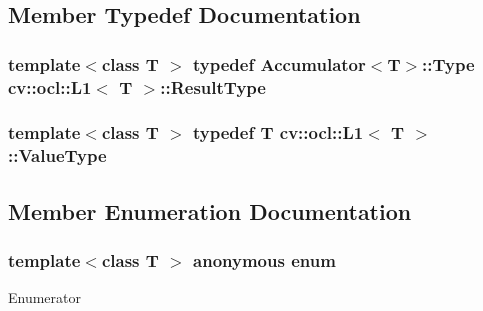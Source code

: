 \subsection{Member Typedef Documentation}
\hypertarget{structcv_1_1ocl_1_1L1_abe051206cac634a5a6bd94feae851875}{
\subsubsection[{Result\-Type}]{\setlength{\rightskip}{0pt plus 5cm}template$<$class T $>$ typedef {\bf Accumulator}$<${\bf T}$>$\-::Type {\bf cv\-::ocl\-::\-L1}$<$ {\bf T} $>$\-::{\bf Result\-Type}}}\label{structcv_1_1ocl_1_1L1_abe051206cac634a5a6bd94feae851875}
\hypertarget{structcv_1_1ocl_1_1L1_a717e28847f2520db35b82753039cebc2}{
\subsubsection[{Value\-Type}]{\setlength{\rightskip}{0pt plus 5cm}template$<$class T $>$ typedef {\bf T} {\bf cv\-::ocl\-::\-L1}$<$ {\bf T} $>$\-::{\bf Value\-Type}}}\label{structcv_1_1ocl_1_1L1_a717e28847f2520db35b82753039cebc2}


\subsection{Member Enumeration Documentation}
\hypertarget{structcv_1_1ocl_1_1L1_aba06491002e9cc3b0a573cf966cbb6bf}{\subsubsection[{anonymous enum}]{\setlength{\rightskip}{0pt plus 5cm}template$<$class T $>$ anonymous enum}}\label{structcv_1_1ocl_1_1L1_aba06491002e9cc3b0a573cf966cbb6bf}
\begin{Desc}
\item[Enumerator]\par
\begin{description}
\item[{\em 
\hypertarget{structcv_1_1ocl_1_1L1_aba06491002e9cc3b0a573cf966cbb6bfa1284db4e2f8401747372b88d9f1b285c}{norm\-Type}\label{structcv_1_1ocl_1_1L1_aba06491002e9cc3b0a573cf966cbb6bfa1284db4e2f8401747372b88d9f1b285c}
}]\end{description}
\end{Desc}


